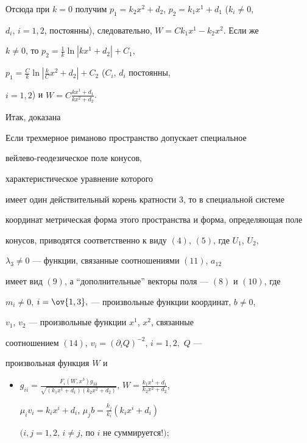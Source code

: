 Отсюда при $k=0$ получим $p_1=k_2x^2+d_2$, $p_2=k_1x^1+d_1$ ($k_i\ne0$, 


$d_i$, $i=1,2$, постоянны), следовательно, $W=C k_1x^1-k_2x^2$. Если же 


$k\ne0$, то $p_2=\frac{1}{k}\ln|kx^1+d_2|+C_1$, 


$p_1=\frac{C}{k}\ln|\frac{k}{C}x^2+d_2|+C_2$ ($C_i$, $d_i$ постоянны, 


$i=1,2$) и $W=C\frac{kx^1+d_1}{kx^2+d_2}$. 


 


Итак, доказана 


 


\begin{thm} 


Если трехмерное риманово пространство допускает специальное 


вейлево-гео\-де\-зи\-чес\-кое поле конусов, 


характеристическое уравнение которого 


имеет один действительный корень кратности $3$, то в специальной системе 


координат метрическая форма этого пространства и форма, определяющая поле 


конусов, приводятся соответственно к виду $(4)$, $(5)$, где $U_1$, $U_2$, 


$\lambda_3\ne0$ --- функции, связанные соотношениями $(11)$, $a_{12}$ 


имеет вид $(9)$, а ``дополнительные'' векторы поля --- $(8)$ и $(10)$, где 


$m_i\ne0$, $i=\ov{1,3},$ --- произвольные функции координат, $b\ne0$, 


$v_1$, $v_2$ --- произвольные функции $x^1$, $x^2$, связанные 


соотношением $(14)$, $v_i=(\partial_i Q)^{-2}$, $i=1,2,$ $Q$ --- 


произвольная функция $W$ и 


\begin{itemize} 


\item[1)] $g_{ii}=\frac{F_i(W,x^3)g_{33}} 


{\sqrt{(k_1x^1+d_1)(k_2x^2+d_2)}}$, $W=\frac{k_1x^1+d_1}{k_2x^2+d_2}$, 


$\mu_i v_i=k_i x^i+d_i$, $\mu_j b=\frac{k_j}{k_i}(k_i x^i+d_i)$ 


$(i,j=1,2$, $i\ne j$, по $i$ не суммируется$!);$ 



\end{itemize}
\end{thm}
